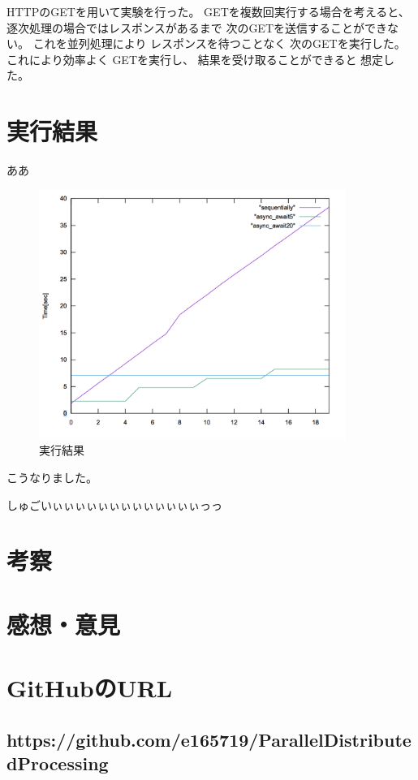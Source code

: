 \documentclass[14pt, oneside]{article}     	%
\begin{document}
HTTPのGETを用いて実験を行った。
GETを複数回実行する場合を考えると、
逐次処理の場合ではレスポンスがあるまで
次のGETを送信することができない。
これを並列処理により
レスポンスを待つことなく
次のGETを実行した。
これにより効率よく
GETを実行し、
結果を受け取ることができると
想定した。

\section{実行結果}

ああ

\begin{figure}[h]
  \centering
  \includegraphics[width=10cm]{time.png}
  \caption{実行結果}
\end{figure}

こうなりました。

しゅごいぃぃぃぃぃぃぃぃぃぃぃぃぃっっ


\section{考察}






\section{感想・意見}
\section*{GitHubのURL}

\subsection*{https://github.com/e165719/ParallelDistributedProcessing}
\end{document}
